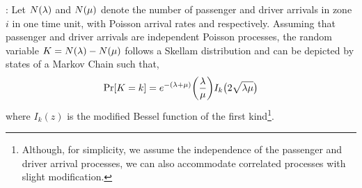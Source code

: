 :
Let $N(\lambda)$ and $N(\mu)$ denote the number of passenger and driver arrivals in zone $i$ in one time unit, with Poisson arrival rates {\passengerarrivalrate} and {\driverarrivalrate} respectively. Assuming that passenger and driver arrivals are independent Poisson processes, the random variable $K = N(\lambda) - N(\mu)$ follows a Skellam distribution and can be depicted by states of a Markov Chain such that,
\begin{equation}
\Pr[K=k] = e^{-(\lambda + \mu)} \bigg(\frac{\lambda}{\mu}\bigg) I_k\big(2 \sqrt{\lambda \mu}\big)
\end{equation}
where $I_k(z)$ is the modified Bessel function of the first kind\footnote{Although, for simplicity, we assume the independence of the passenger and driver arrival processes, we can also accommodate correlated processes with slight modification.}.




